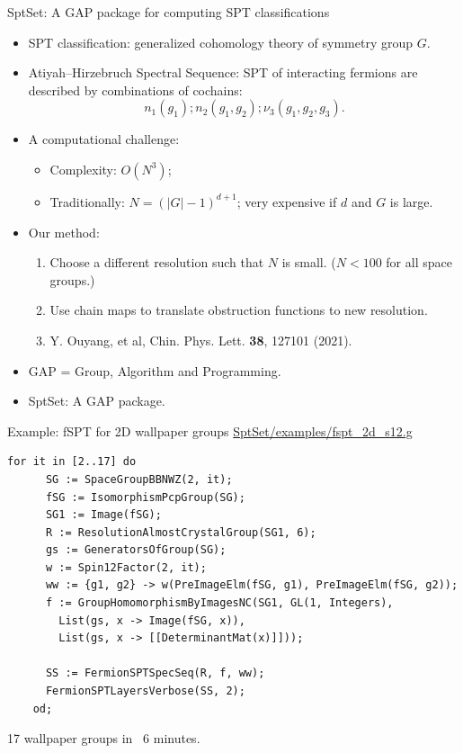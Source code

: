 \documentclass[xcolor=table, 11pt, aspectratio=169]{beamer}
\begin{document}
\begin{frame}{SptSet: A GAP package for computing SPT classifications}
  \begin{itemize}
  \item<1-> SPT classification: generalized cohomology theory of symmetry group $G$.
  \item<1-> Atiyah–Hirzebruch Spectral Sequence: SPT of interacting fermions are described by combinations of cochains:
    \[n_1(g_1); n_2(g_1, g_2); \nu_3(g_1,g_2,g_3).\]
  \item<2-> A computational challenge:
    \begin{itemize}
    \item Complexity: $O(N^3)$;
    \item Traditionally: $N=(|G|-1)^{d+1}$; very expensive if $d$ and $G$ is large.
    \end{itemize}
  \item<3-> Our method:
    \begin{enumerate}
    \item Choose a different \alert{resolution} such that $N$ is small. ($N<100$ for all space groups.)
    \item Use chain maps to translate obstruction functions to new resolution.
    \item Y. Ouyang, et al, Chin. Phys. Lett. \textbf{38}, 127101 (2021).
    \end{enumerate}
  \item<4-> GAP = Group, Algorithm and Programming.
  \item<4-> SptSet: A GAP package.
  \end{itemize}
\end{frame}

\begin{frame}[fragile]{Example: fSPT for 2D wallpaper groups}
	\url{SptSet/examples/fspt_2d_s12.g}
	\begin{lstlisting}[basicstyle=\footnotesize]
    for it in [2..17] do
      SG := SpaceGroupBBNWZ(2, it);
      fSG := IsomorphismPcpGroup(SG);
      SG1 := Image(fSG);
      R := ResolutionAlmostCrystalGroup(SG1, 6);
      gs := GeneratorsOfGroup(SG);
      w := Spin12Factor(2, it);
      ww := {g1, g2} -> w(PreImageElm(fSG, g1), PreImageElm(fSG, g2));
      f := GroupHomomorphismByImagesNC(SG1, GL(1, Integers),
        List(gs, x -> Image(fSG, x)),
        List(gs, x -> [[DeterminantMat(x)]]));

      SS := FermionSPTSpecSeq(R, f, ww);
      FermionSPTLayersVerbose(SS, 2);
    od;
  \end{lstlisting}
  17 wallpaper groups in ~6 minutes.
\end{frame}
\end{document}
